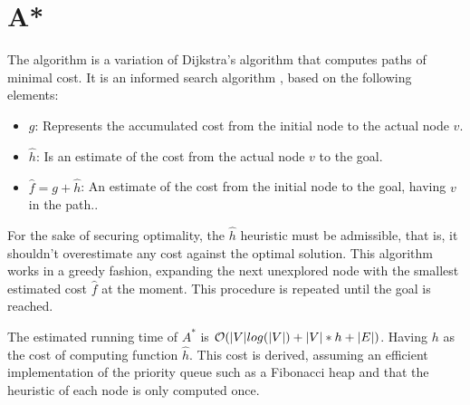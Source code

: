 \section{A*}

The \astar algorithm \cite{art2,book4,book3} is a variation
of Dijkstra's algorithm \cite{book1} that computes 
paths of minimal cost.
It is an informed search algorithm \cite{book4}, based on 
the following elements:

\begin{itemize}
\item $g$: Represents the accumulated cost from the initial node to the actual node $v$.
\item $\hat{h}$: Is an estimate of the cost from the actual node $v$ to the goal.
\item $\hat{f} = g + \hat{h}$: An estimate of the cost from the initial node to the goal, having $v$ in the path..
\end{itemize}

For the sake of securing optimality, the $\hat{h}$ heuristic 
must be admissible, that is, it shouldn't overestimate any 
cost against the optimal solution.
This algorithm works in a greedy fashion, expanding the next unexplored 
node with the smallest estimated cost $\hat{f}$ at the moment. 
This procedure is repeated until the goal is reached. 


The estimated running time of $A^*$ is
$\mathcal{O}(|V|log(|V|) + |V|*h + |E|)$.
Having $h$ as the cost of computing function
$\hat{h}$. This cost is derived, assuming an
efficient implementation of the priority queue
such as a Fibonacci heap \cite{book1} and that
the heuristic of each node is only computed
once.